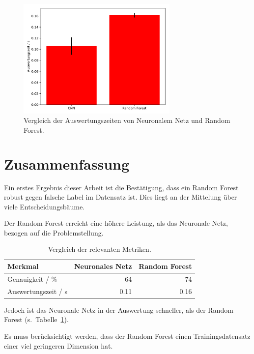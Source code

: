 \begin{figure}
\centering
\includegraphics[width=0.7\textwidth]{content/time.pdf}
\caption{Vergleich der Auswertungszeiten von Neuronalem Netz und Random
Forest.}%
\label{fig:times}
\end{figure}

\hypertarget{zusammenfassung}{%
\section{Zusammenfassung}\label{zusammenfassung}}

Ein erstes Ergebnis dieser Arbeit ist die Bestätigung, dass ein Random
Forest robust gegen falsche Label im Datensatz ist. Dies liegt an der
Mittelung über viele Entscheidungsbäume.

Der Random Forest erreicht eine höhere Leistung, als das Neuronale Netz,
bezogen auf die Problemstellung.

\begin{table}
  \centering
  \caption{Vergleich der relevanten Metriken.}%
  \label{tab:fazit}
  \begin{tabular}[]{@{}lrr@{}}
    \toprule
    Merkmal             & Neuronales Netz & Random Forest \\
    \midrule
    Genauigkeit / \%    & 64              & 74            \\
    Auswertungszeit / s & 0.11            & 0.16          \\
    \bottomrule
  \end{tabular}
\end{table}

Jedoch ist das Neuronale Netz in der Auswertung schneller, als der
Random Forest (s.~Tabelle~\ref{tab:fazit}).

Es muss berücksichtigt werden, dass der Random Forest einen
Trainingsdatensatz einer viel geringeren Dimension hat.


